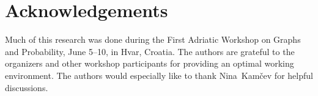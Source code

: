 \documentclass{patmorin}
\begin{document}
\section*{Acknowledgements}

Much of this research was done during the First Adriatic Workshop on Graphs and Probability, June 5--10, in Hvar, Croatia.  The authors are grateful to the organizers and other workshop participants for providing an optimal working environment.  The authors would especially like to thank Nina~Kamčev for helpful discussions.





\end{document}
